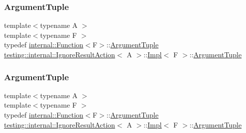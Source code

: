 \subsubsection{\texorpdfstring{ArgumentTuple}{ArgumentTuple}\hspace{0.1cm}{\footnotesize\ttfamily [1/3]}}
{\footnotesize\ttfamily template$<$typename A $>$ \\
template$<$typename F $>$ \\
typedef \mbox{\hyperlink{structtesting_1_1internal_1_1_function}{internal\+::\+Function}}$<$F$>$\+::\mbox{\hyperlink{classtesting_1_1_action_interface_af72720d864da4d606629e83edc003511}{Argument\+Tuple}} \mbox{\hyperlink{classtesting_1_1internal_1_1_ignore_result_action}{testing\+::internal\+::\+Ignore\+Result\+Action}}$<$ A $>$\+::\mbox{\hyperlink{classtesting_1_1internal_1_1_ignore_result_action_1_1_impl}{Impl}}$<$ F $>$\+::\mbox{\hyperlink{classtesting_1_1_action_interface_af72720d864da4d606629e83edc003511}{Argument\+Tuple}}}

\mbox{\label{classtesting_1_1internal_1_1_ignore_result_action_1_1_impl_a1e3be49f0be40b497a57fc462ed3fa23}} 
\subsubsection{\texorpdfstring{ArgumentTuple}{ArgumentTuple}\hspace{0.1cm}{\footnotesize\ttfamily [2/3]}}
{\footnotesize\ttfamily template$<$typename A $>$ \\
template$<$typename F $>$ \\
typedef \mbox{\hyperlink{structtesting_1_1internal_1_1_function}{internal\+::\+Function}}$<$F$>$\+::\mbox{\hyperlink{classtesting_1_1_action_interface_af72720d864da4d606629e83edc003511}{Argument\+Tuple}} \mbox{\hyperlink{classtesting_1_1internal_1_1_ignore_result_action}{testing\+::internal\+::\+Ignore\+Result\+Action}}$<$ A $>$\+::\mbox{\hyperlink{classtesting_1_1internal_1_1_ignore_result_action_1_1_impl}{Impl}}$<$ F $>$\+::\mbox{\hyperlink{classtesting_1_1_action_interface_af72720d864da4d606629e83edc003511}{Argument\+Tuple}}}

